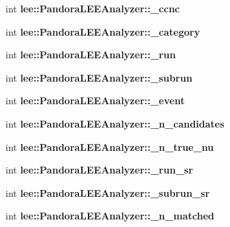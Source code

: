 \begin{DoxyCompactItemize}
\item 
\hypertarget{group__lee_gaae937bb4d388fd91a62a76e251c56c93}{int {\bfseries lee\-::\-Pandora\-L\-E\-E\-Analyzer\-::\-\_\-ccnc}}\label{group__lee_gaae937bb4d388fd91a62a76e251c56c93}

\item 
\hypertarget{group__lee_gac54ac47f84c33553e01edb0419d78570}{int {\bfseries lee\-::\-Pandora\-L\-E\-E\-Analyzer\-::\-\_\-category}}\label{group__lee_gac54ac47f84c33553e01edb0419d78570}

\item 
\hypertarget{group__lee_ga7afce927e448af59dc3f03f6e2fcb911}{int {\bfseries lee\-::\-Pandora\-L\-E\-E\-Analyzer\-::\-\_\-run}}\label{group__lee_ga7afce927e448af59dc3f03f6e2fcb911}

\item 
\hypertarget{group__lee_ga566cffa1b58c7fc0566e696c6c8b8268}{int {\bfseries lee\-::\-Pandora\-L\-E\-E\-Analyzer\-::\-\_\-subrun}}\label{group__lee_ga566cffa1b58c7fc0566e696c6c8b8268}

\item 
\hypertarget{group__lee_gac635405f52f430a32515f06447b98ade}{int {\bfseries lee\-::\-Pandora\-L\-E\-E\-Analyzer\-::\-\_\-event}}\label{group__lee_gac635405f52f430a32515f06447b98ade}

\item 
\hypertarget{group__lee_gab3b7dc079f30897ba737c933e4905b76}{int {\bfseries lee\-::\-Pandora\-L\-E\-E\-Analyzer\-::\-\_\-n\-\_\-candidates}}\label{group__lee_gab3b7dc079f30897ba737c933e4905b76}

\item 
\hypertarget{group__lee_ga4c4794a897538d3307008962f0b96315}{int {\bfseries lee\-::\-Pandora\-L\-E\-E\-Analyzer\-::\-\_\-n\-\_\-true\-\_\-nu}}\label{group__lee_ga4c4794a897538d3307008962f0b96315}

\item 
\hypertarget{group__lee_gae9a94b51ad7618349eee1115c170679d}{int {\bfseries lee\-::\-Pandora\-L\-E\-E\-Analyzer\-::\-\_\-run\-\_\-sr}}\label{group__lee_gae9a94b51ad7618349eee1115c170679d}

\item 
\hypertarget{group__lee_gaba4424e8079da9de241fdd61d648a7f5}{int {\bfseries lee\-::\-Pandora\-L\-E\-E\-Analyzer\-::\-\_\-subrun\-\_\-sr}}\label{group__lee_gaba4424e8079da9de241fdd61d648a7f5}

\item 
\hypertarget{group__lee_ga49bf84147aebe0125c041e58ad39ea63}{int {\bfseries lee\-::\-Pandora\-L\-E\-E\-Analyzer\-::\-\_\-n\-\_\-matched}}\label{group__lee_ga49bf84147aebe0125c041e58ad39ea63}


\end{DoxyCompactItemize}
